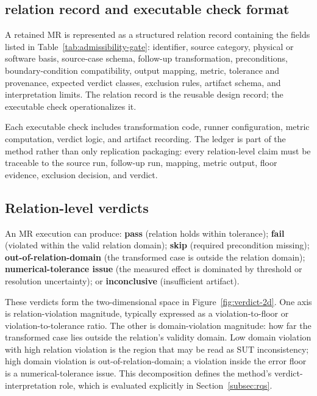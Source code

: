\documentclass[preprint,12pt,authoryear]{elsarticle}
\begin{document}
\subsection{relation record and executable check format}
\label{subsec:relation-record}

A retained MR is represented as a structured relation record containing the fields listed in Table~\ref{tab:admissibility-gate}: identifier, source category, physical or software basis, source-case schema, follow-up transformation, preconditions, boundary-condition compatibility, output mapping, metric, tolerance and provenance, expected verdict classes, exclusion rules, artifact schema, and interpretation limits. The relation record is the reusable design record; the executable check operationalizes it.

Each executable check includes transformation code, runner configuration, metric computation, verdict logic, and artifact recording. The ledger is part of the method rather than only replication packaging: every relation-level claim must be traceable to the source run, follow-up run, mapping, metric output, floor evidence, exclusion decision, and verdict.

\subsection{Relation-level verdicts}
\label{subsec:verdicts}

An MR execution can produce: \textbf{pass} (relation holds within tolerance); \textbf{fail} (violated within the valid relation domain); \textbf{skip} (required precondition missing); \textbf{out-of-relation-domain} (the transformed case is outside the relation domain); \textbf{numerical-tolerance issue} (the measured effect is dominated by threshold or resolution uncertainty); or \textbf{inconclusive} (insufficient artifact).

These verdicts form the two-dimensional space in Figure~\ref{fig:verdict-2d}. One axis is relation-violation magnitude, typically expressed as a violation-to-floor or violation-to-tolerance ratio. The other is domain-violation magnitude: how far the transformed case lies outside the relation's validity domain. Low domain violation with high relation violation is the region that may be read as SUT inconsistency; high domain violation is out-of-relation-domain; a violation inside the error floor is a numerical-tolerance issue. This decomposition defines the method's verdict-interpretation role, which is evaluated explicitly in Section~\ref{subsec:rqs}.
\end{document}
